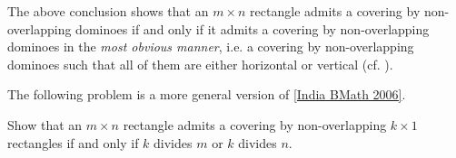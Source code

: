\begin{remark}
The above conclusion shows that 
an $m\times n$ rectangle admits a covering by non-overlapping dominoes if and only if 
it admits a covering by non-overlapping dominoes in the \emph{most obvious manner}, i.e. a covering by non-overlapping dominoes such that all of them are either horizontal or vertical
(cf. \cite[p. 6]{BrualdiIntroCombi}). 
\end{remark}

The following problem is a more general version of \cref{India BMath 2006}. 

\begin{example}
\cite[Problem 8, Chapter 2, p. 26]{EngelProblemSolvingStrategies}
Show that an $m\times n$ rectangle admits a covering by non-overlapping $k\times 1$ rectangles if and only if $k$ divides $m$ or $k$ divides $n$. 
\end{example}
